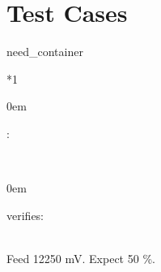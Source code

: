 \documentclass[a4paper,10pt,english]{sphinxmanual}
\begin{document}
\chapter{Test Cases}
\label{\detokenize{requirements/tests:test-cases}}\label{\detokenize{requirements/tests::doc}}
\begin{sphinxuseclass}{need_container}

\begin{savenotes}\sphinxattablestart
\sphinxthistablewithglobalstyle
\centering
{}\label{\detokenize{requirements/tests:TC_SOC_RANGE}}\nobreak
\begin{tabular}[t]{*{1}{}}
\sphinxtoprule
\sphinxtableatstartofbodyhook
\begin{DUlineblock}{0em}
\item[] :     
\end{DUlineblock}
\\
\sphinxhline
\begin{DUlineblock}{0em}
\item[] \item[] 

\item[] \item[] verifies: 

\end{DUlineblock}
\\
\sphinxhline
\sphinxAtStartPar
Feed 12250 mV. Expect 50 \%.
\\
\sphinxbottomrule
\end{tabular}
\sphinxtableafterendhook\par
\sphinxattableend\end{savenotes}

\end{sphinxuseclass}
\end{document}
